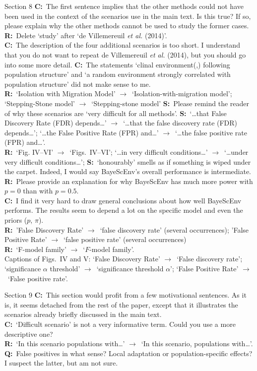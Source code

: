 \documentclass[11pt]{article}
\newenvironment{my_description}
{\begin{description}
  \setlength{\itemsep}{2pt}
  \setlength{\parskip}{0pt}
  \setlength{\parsep}{0pt}}
{\end{description}}
\newcommand{\ra}{$\rightarrow$\ }
\newcommand{\C}{\textbf{C:}\ }
\newcommand{\Q}{\textbf{Q:}\ }
\newcommand{\R}{\textbf{R:}\ }
\newcommand{\V}{\textbf{S:}\ }
\begin{document}
\begin{my_description}
	\item[Section 8] \C The first sentence implies that the other methods could not have been used in the context of the scenarios use in the main text. Is this true? If so, please explain why the other methods cannot be used to study the former cases.\\
	\R Delete `study' after `de Villemereuil \emph{et al.} (2014)'.\\
	\C The description of the four additional scenarios is too short. I understand that you do not want to repeat de Villemereuil \emph{et al.} (2014), but you should go into some more detail. \C The statements `clinal environment(,) following population structure' and `a random environment strongly correlated with population structure' did not make sense to me.\\
	\R `Isolation with Migration Model' \ra `Isolation-with-migration model'; `Stepping-Stone model' \ra `Stepping-stone model'
	\V Please remind the reader of why these scenarios are `very difficult for all methods'.
	\V `\dots that False Discovery Rate (FDR) depends\dots' \ra `\dots that the false discovery rate (FDR) depends\dots'; `\dots the False Positive Rate (FPR) and\dots' \ra `\dots the false positive rate (FPR) and\dots'.\\
	
	\R `Fig. IV--VI' \ra `Figs.\ IV--VI'; `\dots in very difficult conditions\dots' \ra `\dots under very difficult conditions\dots'; \V `honourably' smells as if something is wiped under the carpet. Indeed, I would say BayeScEnv's overall performance is intermediate.\\
	\R Please provide an explanation for why BayeScEnv has much more power with $p=0$ than with $p=0.5$.\\
	\C I find it very hard to draw general conclusions about how well BayeScEnv performs. The results seem to depend a lot on the specific model and even the priors ($p$, $\pi$).\\
	\R 'False Discovery Rate' \ra `false discovery rate' (several occurrences); 'False Positive Rate' \ra `false positive rate' (several occurrences)\\
	\R `F-model family' \ra `$F$-model family'.\\
	Captions of Figs.\ IV and V: `False Discovery Rate' \ra `False discovery rate'; `significance $\alpha$ threshold' \ra `significance threshold $\alpha$'; `False Positive Rate' \ra `False positive rate'.
	
	\item[Section 9]
	\C This section would profit from a few motivational sentences. As it is, it seems detached from the rest of the paper, except that it illustrates the scenarios already briefly discussed in the main text.\\
	\C `Difficult scenario' is not a very informative term. Could you use a more descriptive one?\\
	\R `In this scenario populations with\dots' \ra `In this scenario, populations with\dots'.\\
	\Q False positives in what sense? Local adaptation or population-specific effects? I suspect the latter, but am not sure.
	

\end{my_description}
\end{document}
